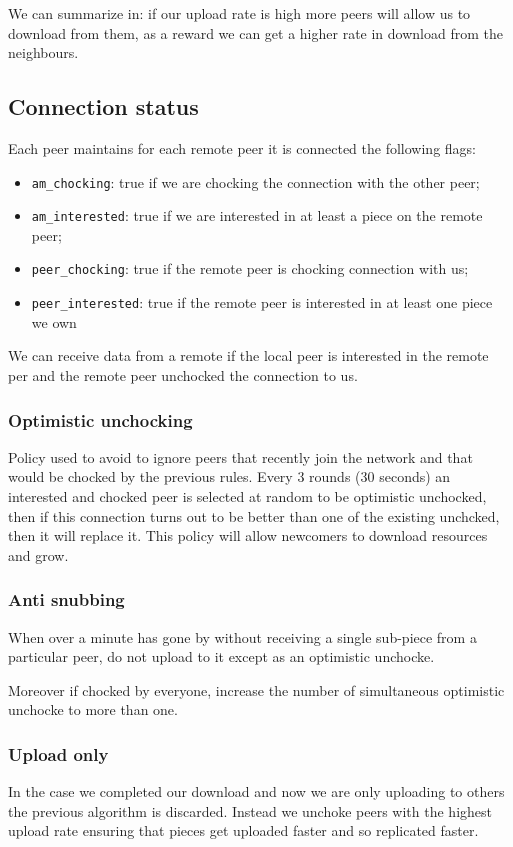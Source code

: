 We can summarize in: if our upload rate is high more peers will allow us to download from them, as a reward we can get a higher rate in download from the neighbours.

\subsection{Connection status}
Each peer maintains for each remote peer it is connected the following flags:
\begin{itemize}
    \item \verb|am_chocking|: true if we are chocking the connection with the other peer;
    \item \verb|am_interested|: true if we are interested in at least a piece on the remote peer;
    \item \verb|peer_chocking|: true if the remote peer is chocking connection with us;
    \item \verb|peer_interested|: true if the remote peer is interested in at least one piece we own
\end{itemize}
We can receive data from a remote if the local peer is interested in the remote per and the remote peer unchocked the connection to us.

\subsubsection{Optimistic unchocking}
Policy used to avoid to ignore peers that recently join the network and that would be chocked by the previous rules.
Every 3 rounds (30 seconds) an interested and chocked peer is selected at random to be optimistic unchocked, then if this connection turns out to be better than one of the existing unchcked, then it will replace it.
This policy will allow newcomers to download resources and grow.

\subsubsection{Anti snubbing}
When over a minute has gone by without receiving a single sub-piece from a particular peer, do not upload to it except as an optimistic unchocke.

Moreover if chocked by everyone, increase the number of simultaneous optimistic unchocke to more than one.

\subsubsection{Upload only}
In the case we completed our download and now we are only uploading to others the previous algorithm is discarded.
Instead we unchoke peers with the highest upload rate ensuring that pieces get uploaded faster and so replicated faster.

